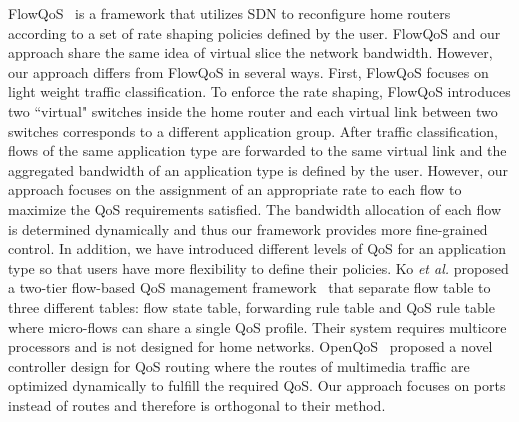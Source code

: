 FlowQoS~\cite{Seddiki_HotSDN14} is a framework that utilizes SDN to reconfigure home routers according to a set of rate shaping
policies defined by the user. FlowQoS and our approach share the same idea of virtual slice the network bandwidth. However,
our approach differs from FlowQoS in several ways. First, FlowQoS focuses on light weight traffic classification. To enforce
the rate shaping, FlowQoS introduces two ``virtual" switches inside the home router and each virtual link between two switches 
corresponds to a different application group. After traffic classification, flows of the same application type are forwarded to
the same virtual link and the aggregated bandwidth of an application type is defined by the user. However, our approach focuses
on the assignment of an appropriate rate to each flow to maximize the QoS requirements satisfied. The bandwidth allocation of each
flow is determined dynamically and thus our framework provides more fine-grained control. In addition, we have introduced different
levels of QoS for an application type so that users have more flexibility to define their policies. Ko \textit{et al.}\xspace proposed a two-tier
flow-based QoS management framework~\cite{Ko_IEICE13} that separate flow table to three different tables: flow state table, forwarding
rule table and QoS rule table where micro-flows can share a single QoS profile. Their system requires multicore processors and is
not designed for home networks. OpenQoS~\cite{Egilmez_ASPIPA12} proposed a novel controller design for QoS routing where the routes of
multimedia traffic are optimized dynamically to fulfill the required QoS. Our approach focuses on ports instead of routes and therefore
is orthogonal to their method.
